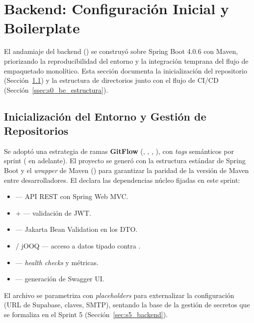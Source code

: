 \section{Backend: Configuración Inicial y Boilerplate}
\label{sec:s0_backend}

El andamiaje del backend () se construyó sobre Spring Boot 4.0.6 con Maven,
priorizando la reproducibilidad del entorno y la integración temprana del flujo de
empaquetado monolítico. Esta sección documenta la inicialización del repositorio
(Sección~\ref{ssec:s0_be_init}) y la estructura de directorios junto con el flujo de CI/CD
(Sección~\ref{ssec:s0_be_estructura}).\par

\subsection{Inicialización del Entorno y Gestión de Repositorios}
\label{ssec:s0_be_init}

Se adoptó una estrategia de ramas \textbf{GitFlow} (, ,
, ), con \textit{tags} semánticos por sprint
( en adelante). El proyecto se generó con la estructura estándar de
Spring Boot y el \textit{wrapper} de Maven () para garantizar la paridad de la
versión de Maven entre desarrolladores. El  declara las dependencias núcleo
fijadas en este sprint:

\begin{itemize}[noitemsep]
    \item {} --- API REST con Spring Web MVC.
    \item {} +  --- validación de JWT.
    \item {} --- Jakarta Bean Validation en los DTO.
    \item {} / jOOQ --- acceso a datos tipado contra .
    \item {} --- \textit{health checks} y métricas.
    \item {} --- generación de Swagger UI.
\end{itemize}

El archivo  se parametriza con \textit{placeholders}
 para externalizar la configuración (URL de Supabase, claves, SMTP),
sentando la base de la gestión de secretos que se formaliza en el Sprint 5
(Sección~\ref{sec:s5_backend}).

